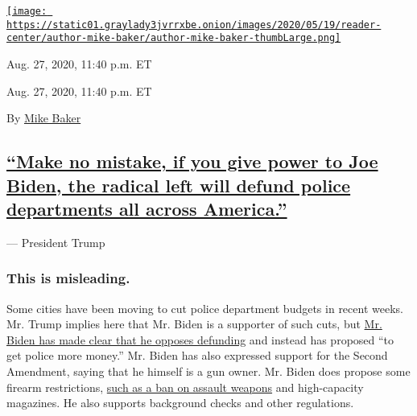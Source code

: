 \href{https://www.nytimes3xbfgragh.onion/by/mike-baker}{\texttt{[image: https://static01.graylady3jvrrxbe.onion/images/2020/05/19/reader-center/author-mike-baker/author-mike-baker-thumbLarge.png]}}

Aug. 27, 2020, 11:40 p.m. ET

Aug. 27, 2020, 11:40 p.m. ET

By \href{https://www.nytimes3xbfgragh.onion/by/mike-baker}{Mike Baker}

\hypertarget{make-no-mistake-if-you-give-power-to-joe-biden-the-radical-left-will-defund-police-departments-all-across-america}{%
\subsection{\texorpdfstring{\protect\hyperlink{make-no-mistake-if-you-give-power-to-joe-biden-the-radical-left-will-defund-police-departments-all-across-america}{``Make
no mistake, if you give power to Joe Biden, the radical left will defund
police departments all across
America.''}}{``Make no mistake, if you give power to Joe Biden, the radical left will defund police departments all across America.''}}\label{make-no-mistake-if-you-give-power-to-joe-biden-the-radical-left-will-defund-police-departments-all-across-america}}

--- President Trump

\hypertarget{this-is-misleading-}{%
\subsubsection{\texorpdfstring{\textbf{This is misleading.}
}{This is misleading. }}\label{this-is-misleading-}}

Some cities have been moving to cut police department budgets in recent
weeks. Mr. Trump implies here that Mr. Biden is a supporter of such
cuts, but
\href{https://slack-redir.net/link?url=https\%3A\%2F\%2Fwww.nytimes3xbfgragh.onion\%2F2020\%2F06\%2F08\%2Fus\%2Fpolitics\%2Fbiden-defund-the-police.html}{Mr.
Biden has made clear that he opposes defunding} and instead has proposed
``to get police more money.'' Mr. Biden has also expressed support for
the Second Amendment, saying that he himself is a gun owner. Mr. Biden
does propose some firearm restrictions,
\href{https://slack-redir.net/link?url=https\%3A\%2F\%2Fwww.nytimes3xbfgragh.onion\%2F2019\%2F08\%2F11\%2Fopinion\%2Fjoe-biden-ban-assault-weapons.html}{such
as a ban on assault weapons} and high-capacity magazines. He also
supports background checks and other regulations.

